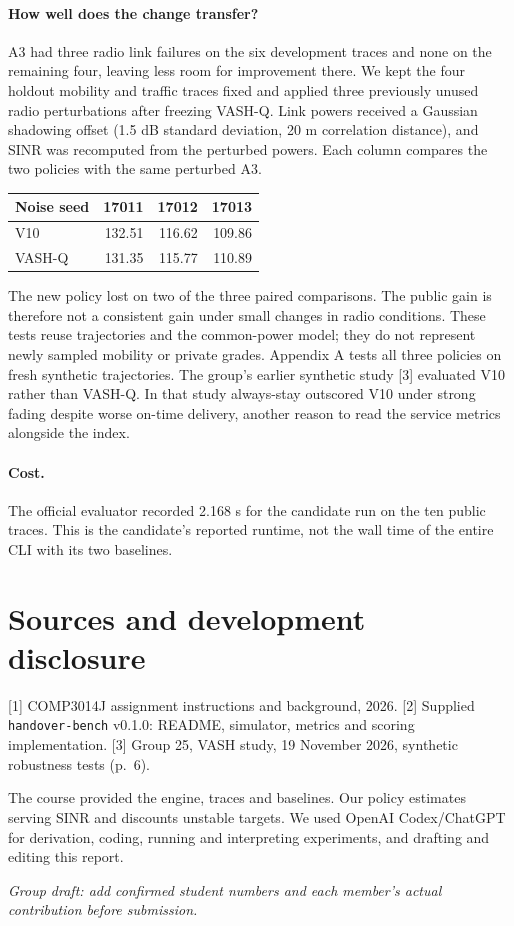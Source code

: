 \documentclass[11pt,a4paper]{article}
\begin{document}
\paragraph{How well does the change transfer?} A3 had three radio link failures on the six development traces and none on the remaining four, leaving less room for improvement there. We kept the four holdout mobility and traffic traces fixed and applied three previously unused radio perturbations after freezing VASH-Q. Link powers received a Gaussian shadowing offset (1.5 dB standard deviation, 20 m correlation distance), and SINR was recomputed from the perturbed powers. Each column compares the two policies with the same perturbed A3.
\begin{center}\begin{tabular}{lrrr}\toprule
Noise seed&17011&17012&17013\\\midrule
V10&132.51&116.62&109.86\\
VASH-Q&131.35&115.77&110.89\\\bottomrule
\end{tabular}\end{center}
The new policy lost on two of the three paired comparisons. The public gain is therefore not a consistent gain under small changes in radio conditions. These tests reuse trajectories and the common-power model; they do not represent newly sampled mobility or private grades. Appendix A tests all three policies on fresh synthetic trajectories. The group's earlier synthetic study [3] evaluated V10 rather than VASH-Q. In that study always-stay outscored V10 under strong fading despite worse on-time delivery, another reason to read the service metrics alongside the index.
\paragraph{Cost.} The official evaluator recorded 2.168 s for the candidate run on the ten public traces. This is the candidate's reported runtime, not the wall time of the entire CLI with its two baselines.
\section{Sources and development disclosure}
[1] COMP3014J assignment instructions and background, 2026. [2] Supplied \texttt{handover-bench} v0.1.0: README, simulator, metrics and scoring implementation. [3] Group 25, VASH study, 19 November 2026, synthetic robustness tests (p.~6).
\par The course provided the engine, traces and baselines. Our policy estimates serving SINR and discounts unstable targets. We used OpenAI Codex/ChatGPT for derivation, coding, running and interpreting experiments, and drafting and editing this report.
\par\textit{Group draft: add confirmed student numbers and each member's actual contribution before submission.}
\newpage
\appendix
\end{document}
